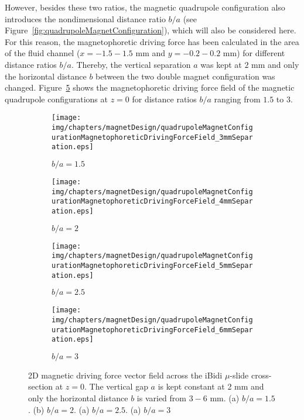 However, besides these two ratios, the magnetic quadrupole configuration also introduces the nondimensional distance ratio $b/a$ (see Figure~\ref{fig:quadrupoleMagnetConfiguration}), which will also be considered here. For this reason, the magnetophoretic driving force has been calculated in the area of the fluid channel ($x = -1.5-1.5$ mm and $y = -0.2-0.2$ mm) for different distance ratios $b/a$. Thereby, the vertical separation $a$ was kept at $2$ mm and only the horizontal distance $b$ between the two double magnet configuration was changed. Figure~\ref{fig:magnetophoreticDrivingForceField} shows the magnetophoretic driving force field of the magnetic quadrupole configurations at $z=0$ for distance ratios $b/a$ ranging from $1.5$ to $3$. 

\begin{figure}[htb]
\centering
	\begin{subfigure}[b]{0.48\textwidth}
		\texttt{[image: img/chapters/magnetDesign/quadrupoleMagnetConfigurationMagnetophoreticDrivingForceField\_3mmSeparation.eps]}
	\caption{$b/a = 1.5$}
    \label{fig:magnetophoreticDrivingForceField_3mm}
    \end{subfigure}
    \hfill
	\begin{subfigure}[b]{0.48\textwidth}
		\texttt{[image: img/chapters/magnetDesign/quadrupoleMagnetConfigurationMagnetophoreticDrivingForceField\_4mmSeparation.eps]}
	\caption{$b/a = 2$}
	\label{fig:magnetophoreticDrivingForceField_4mm}
	\end{subfigure}
	\hfill
	\begin{subfigure}[b]{0.48\textwidth}
		\texttt{[image: img/chapters/magnetDesign/quadrupoleMagnetConfigurationMagnetophoreticDrivingForceField\_5mmSeparation.eps]}
	\caption{$b/a = 2.5$}
	\label{fig:magnetophoreticDrivingForceField_5mm}
	\end{subfigure}
	\hfill
	\begin{subfigure}[b]{0.48\textwidth}
		\texttt{[image: img/chapters/magnetDesign/quadrupoleMagnetConfigurationMagnetophoreticDrivingForceField\_6mmSeparation.eps]}
	\caption{$b/a = 3$}
	\label{fig:magnetophoreticDrivingForceField_6mm}
	\end{subfigure}
\caption[Vector field of the magnetic driving force of the quadrupole magnet configuration across the iBidi $\mu$-slide]{2D magnetic driving force vector field across the iBidi $\mu$-slide cross-section at $z=0$. The vertical gap $a$ is kept constant at 2 mm and only the horizontal distance $b$ is varied from $3-6$ mm. (a) $b/a=1.5$. (b) $b/a=2$. (a) $b/a=2.5$. (a) $b/a=3$}%
\label{fig:magnetophoreticDrivingForceField}
\end{figure}

